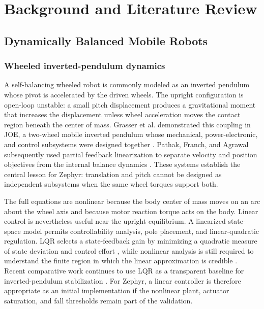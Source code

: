 \chapter{Background and Literature Review}\label{ch:background-and-literature-review}

\section{Dynamically Balanced Mobile Robots}\label{dynamically-balanced-mobile-robots}

\subsection{Wheeled inverted-pendulum dynamics}\label{wheeled-inverted-pendulum-dynamics}

A self-balancing wheeled robot is commonly modeled as an inverted
pendulum whose pivot is accelerated by the driven wheels. The upright
configuration is open-loop unstable: a small pitch displacement produces
a gravitational moment that increases the displacement unless wheel
acceleration moves the contact region beneath the center of mass.
Grasser et al. demonstrated this coupling in JOE, a two-wheel mobile
inverted pendulum whose mechanical, power-electronic, and control
subsystems were designed together \cite{grasser2002joe}. Pathak, Franch, and Agrawal
subsequently used partial feedback linearization to separate velocity
and position objectives from the internal balance dynamics \cite{pathak2005wip}.
These systems establish the central lesson for Zephyr: translation and
pitch cannot be designed as independent subsystems when the same wheel
torques support both.

The full equations are nonlinear because the body center of mass moves
on an arc about the wheel axis and because motor reaction torque acts on
the body. Linear control is nevertheless useful near the upright
equilibrium. A linearized state-space model permits controllability
analysis, pole placement, and linear-quadratic regulation. LQR selects a
state-feedback gain by minimizing a quadratic measure of state deviation
and control effort \cite{anderson1990optimal}, while nonlinear analysis is still required
to understand the finite region in which the linear approximation is
credible \cite{khalil2002nonlinear}. Recent comparative work continues to use LQR as a
transparent baseline for inverted-pendulum stabilization \cite{chacko2023trajectory}. For
Zephyr, a linear controller is therefore appropriate as an initial
implementation if the nonlinear plant, actuator saturation, and fall
thresholds remain part of the validation.

